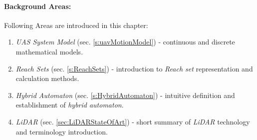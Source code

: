 \paragraph{Background Areas:} Following Areas are introduced in this chapter:
\begin{enumerate}
    \item \emph{UAS System Model} (sec. \ref{s:uavMotionModel}) - continuous and discrete mathematical models.
    
    \item \emph{Reach Sets} (sec. \ref{s:ReachSets}) - introduction to \emph{Reach set} representation and calculation methods.
    
    \item \emph{Hybrid Automaton} (sec. \ref{s:HybridAutomaton}) - intuitive definition and establishment of \emph{hybrid automaton}.
    
    \item \emph{LiDAR} (sec. \ref{sec:LiDARStateOfArt}) - short summary of \emph{LiDAR} technology and terminology introduction.
\end{enumerate}
